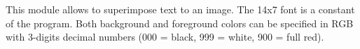This module allows to superimpose text to an image. The 14x7 font is
a constant of the program. Both background and foreground colors can
be specified in RGB with 3-digits decimal numbers (000 = black,
999 = white, 900 = full red).

